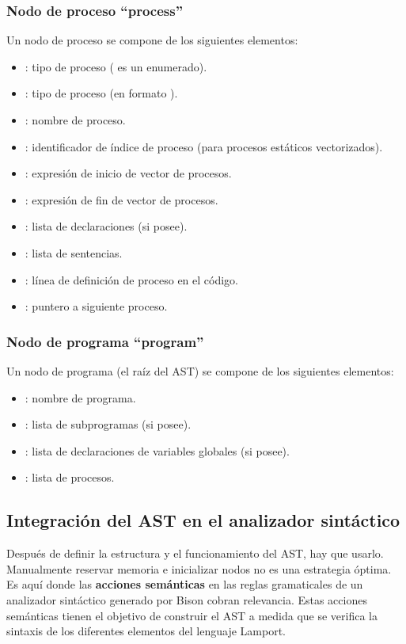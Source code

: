 \subsubsection{Nodo de proceso ``process''}
\noindent
Un nodo de proceso se compone de los siguientes elementos:
\begin{itemize}
    \item {}: tipo de proceso ( es un enumerado).
    \item {}: tipo de proceso (en formato ).
    \item {}: nombre de proceso.
    \item {}: identificador de índice de proceso (para procesos estáticos vectorizados).
    \item {}: expresión de inicio de vector de procesos.
    \item {}: expresión de fin de vector de procesos.
    \item {}: lista de declaraciones (si posee).
    \item {}: lista de sentencias.
    \item {}: línea de definición de proceso en el código.
    \item {}: puntero a siguiente proceso.
\end{itemize}

\subsubsection{Nodo de programa ``program''}
\noindent
Un nodo de programa (el raíz del AST) se compone de los siguientes elementos:
\begin{itemize}
    \item {}: nombre de programa.
    \item {}: lista de subprogramas (si posee).
    \item {}: lista de declaraciones de variables globales (si posee).
    \item {}: lista de procesos.
\end{itemize}

\subsection{Integración del AST en el analizador sintáctico}
Después de definir la estructura y el funcionamiento del AST, hay que usarlo. Manualmente reservar memoria e inicializar nodos no es una estrategia óptima. Es aquí donde las \textbf{acciones semánticas} en las reglas gramaticales de un analizador sintáctico generado por Bison cobran relevancia. Estas acciones semánticas tienen el objetivo de construir el AST a medida que se verifica la sintaxis de los diferentes elementos del lenguaje Lamport.


